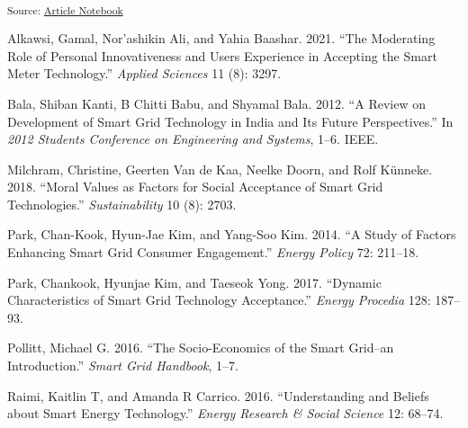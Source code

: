 \documentclass[
  letterpaper,
  DIV=11,
  numbers=noendperiod]{scrartcl}
\newlength{\cslhangindent}
\newenvironment{CSLReferences}[2] %
 {\begin{list}{}{%
  \setlength{\itemindent}{0pt}
  \setlength{\leftmargin}{0pt}
  \setlength{\parsep}{0pt}
  \ifodd #1
   \setlength{\leftmargin}{\cslhangindent}
   \setlength{\itemindent}{-1\cslhangindent}
  \fi
  \setlength{\itemsep}{#2\baselineskip}}}
 {\end{list}}
\begin{document}
\textsubscript{Source:
\href{https://sijuswamyresearch.github.io/SM-project/index-preview.html}{Article
Notebook}}

\label{refs}
\begin{CSLReferences}{1}{0}
Alkawsi, Gamal, Nor'ashikin Ali, and Yahia Baashar. 2021. {``The
Moderating Role of Personal Innovativeness and Users Experience in
Accepting the Smart Meter Technology.''} \emph{Applied Sciences} 11 (8):
3297.

Bala, Shiban Kanti, B Chitti Babu, and Shyamal Bala. 2012. {``A Review
on Development of Smart Grid Technology in India and Its Future
Perspectives.''} In \emph{2012 Students Conference on Engineering and
Systems}, 1--6. IEEE.

Milchram, Christine, Geerten Van de Kaa, Neelke Doorn, and Rolf Künneke.
2018. {``Moral Values as Factors for Social Acceptance of Smart Grid
Technologies.''} \emph{Sustainability} 10 (8): 2703.

Park, Chan-Kook, Hyun-Jae Kim, and Yang-Soo Kim. 2014. {``A Study of
Factors Enhancing Smart Grid Consumer Engagement.''} \emph{Energy
Policy} 72: 211--18.

Park, Chankook, Hyunjae Kim, and Taeseok Yong. 2017. {``Dynamic
Characteristics of Smart Grid Technology Acceptance.''} \emph{Energy
Procedia} 128: 187--93.

Pollitt, Michael G. 2016. {``The Socio-Economics of the Smart Grid--an
Introduction.''} \emph{Smart Grid Handbook}, 1--7.

Raimi, Kaitlin T, and Amanda R Carrico. 2016. {``Understanding and
Beliefs about Smart Energy Technology.''} \emph{Energy Research \&
Social Science} 12: 68--74.

\end{CSLReferences}
\end{document}
